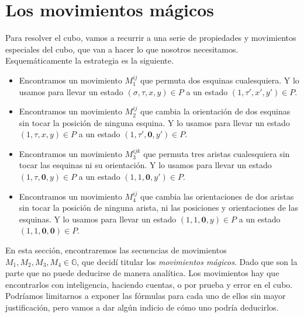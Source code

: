 \documentclass{article}
\theoremstyle{definition}
\newcommand{\G}{\mathbb{G}}
\begin{document}
\section{Los movimientos mágicos}
Para resolver el cubo, vamos a recurrir a una serie de propiedades y movimientos especiales del cubo, que van a hacer lo que nosotros necesitamos. Esquemáticamente la estrategia es la siguiente.
\begin{itemize}
    \item Encontramos un movimiento $M_1^{ij}$ que permuta dos esquinas cualesquiera. Y lo usamos para llevar un estado $(\sigma,\tau,x,y)\in P$ a un estado $(1,\tau',x',y')\in P$.
    \item Encontramos un movimiento $M_2^{ij}$ que cambia la orientación de dos esquinas sin tocar la posición de ninguna esquina. Y lo usamos para llevar un estado $(1,\tau,x,y)\in P$ a un estado $ (1,\tau',\mathbf{0},y')\in P$.
    \item Encontramos un movimiento $M_3^{ijk}$ que permuta tres aristas cualesquiera sin tocar las esquinas ni su orientación. Y lo usamos para llevar un estado $(1,\tau,\mathbf{0},y)\in P$ a un estado $(1,1,\mathbf{0},y')\in P$.
    \item Encontramos un movimiento $M_4^{ij}$ que cambia las orientaciones de dos aristas sin tocar la posición de ninguna arista, ni las posiciones y orientaciones de las esquinas. Y lo usamos para llevar un estado $(1,1,\mathbf{0},y)\in P$ a un estado $(1,1,\mathbf{0},\mathbf{0})\in P$.
\end{itemize}
En esta sección, encontraremos las secuencias de movimientos $M_1, M_2,M_3,M_4\in \G$, que decidí titular los \textit{movimientos mágicos}. Dado que son la parte que no puede deducirse de manera analítica. Los movimientos hay que encontrarlos con inteligencia, haciendo cuentas, o por prueba y error en el cubo. Podríamos limitarnos a exponer las fórmulas para cada uno de ellos sin mayor justificación, pero vamos a dar algún indicio de cómo uno podría deducirlos.
\end{document}
